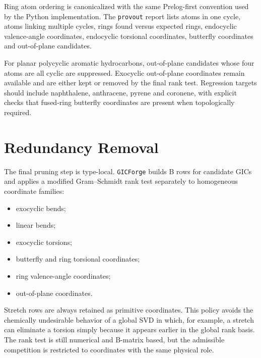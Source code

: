 \documentclass[11pt]{article}
\newcommand{\program}{\texttt{GICForge}}
\newcommand{\provout}{\texttt{provout}}
\begin{document}
Ring atom ordering is canonicalized with the same Prelog-first convention used
by the Python implementation.  The \provout{} report lists atoms in one cycle,
atoms linking multiple cycles, rings found versus expected rings, endocyclic
valence-angle coordinates, endocyclic torsional coordinates, butterfly
coordinates and out-of-plane candidates.

For planar polycyclic aromatic hydrocarbons, out-of-plane candidates whose four
atoms are all cyclic are suppressed.  Exocyclic out-of-plane coordinates remain
available and are either kept or removed by the final rank test.  Regression
targets should include naphthalene, anthracene, pyrene and coronene, with
explicit checks that fused-ring butterfly coordinates are present when
topologically required.

\section{Redundancy Removal}

The final pruning step is type-local.  \program{} builds B rows for candidate
GICs and applies a modified Gram--Schmidt rank test separately to homogeneous
coordinate families:

\begin{itemize}
  \item exocyclic bends;
  \item linear bends;
  \item exocyclic torsions;
  \item butterfly and ring torsional coordinates;
  \item ring valence-angle coordinates;
  \item out-of-plane coordinates.
\end{itemize}

\noindent
Stretch rows are always retained as primitive coordinates.  This policy avoids
the chemically undesirable behavior of a global SVD in which, for example, a
stretch can eliminate a torsion simply because it appears earlier in the global
rank basis.  The rank test is still numerical and B-matrix based, but the
admissible competition is restricted to coordinates with the same physical
role.
\end{document}
